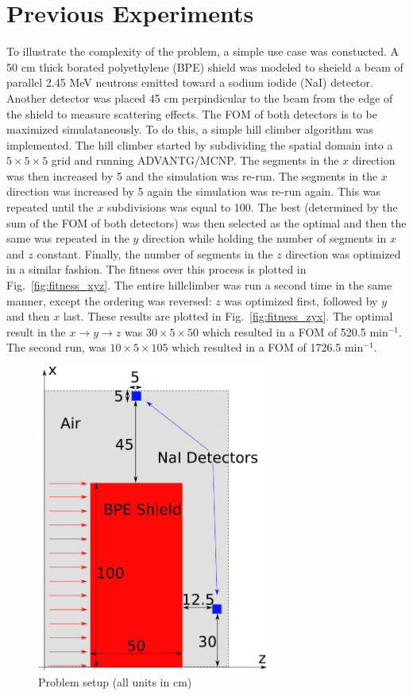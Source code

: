 \documentclass{article}
\begin{document}
\section{Previous Experiments}
To illustrate the complexity of the problem, a simple use case was constucted. A 50 cm thick borated polyethylene (BPE) shield was modeled to sheield a beam of parallel 2.45 MeV neutrons emitted toward a sodium iodide (NaI) detector. Another detector was placed 45 cm perpindicular to the beam from the edge of the shield to measure scattering effects. The FOM of both detectors is to be maximized simulataneously. To do this, a simple hill climber algorithm was implemented. The hill climber started by subdividing the spatial domain into a $5 \times 5 \times 5$ grid and running ADVANTG/MCNP. The segments in the $x$ direction was then increased by 5 and the simulation was re-run. The segments in the $x$ direction was increased by 5 again the simulation was re-run again. This was repeated until the $x$ subdivisions was equal to 100. The best (determined by the sum of the FOM of both detectors) was then selected as the optimal and then the same was repeated in the $y$ direction while holding the number of segments in $x$ and $z$ constant. Finally, the number of segments in the $z$ direction was optimized in a similar fashion. The fitness over this process is plotted in Fig.~\ref{fig:fitness_xyz}. The entire hillclimber was run a second time in the same manner, except the ordering was reversed: $z$ was optimized first, followed by $y$ and then $x$ last. These results are plotted in Fig.~\ref{fig:fitness_zyx}. The optimal result in the $x \rightarrow y \rightarrow z$ was $30 \times 5 \times 50$ which resulted in a FOM of 520.5 min$^{-1}$. The second run, was $10 \times 5 \times 105$ which resulted in a FOM of 1726.5 min$^{-1}$.

\begin{figure}
    \centering
    \includegraphics[width=3.0in]{probsetup}
    \caption{Problem setup (all units in cm)}
    \label{fig:probsetup}
\end{figure}
\end{document}
